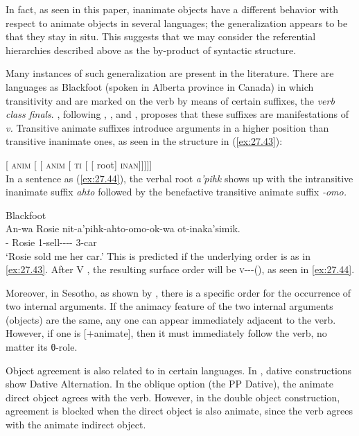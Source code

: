 \documentclass[output=paper]{langsci/langscibook}
\begin{document}
In fact, as seen in this paper, inanimate objects have a different behavior
with respect to animate objects in several languages; the generalization
appears to be that they stay in situ. This suggests that we may consider the
referential hierarchies described above as the by-product of syntactic
structure.

Many instances of such generalization are present in the literature. There are
languages as Blackfoot (spoken in Alberta province in Canada) in which
transitivity and  are marked on the verb by means of certain suffixes,
the \emph{verb class finals}. \citet[66]{Bliss2010}, following
\citet{RitterRosen2008}, \citet{Brittain2003}, \citet{Hirose2001} and
\citet{Mathieu2006}, proposes that these suffixes are manifestations of
\emph{v.}  Transitive animate suffixes introduce arguments in a higher
position than transitive inanimate ones, as seen in the structure in
(\ref{ex:27.43}):

\ea\label{ex:27.43}
    [ \textsc{anim} [  \Ta{} [
    \textsc{anim}  [ \textsc{ti} [  [ root] \textsc{inan}]]]]]\\
\z
In a sentence as (\ref{ex:27.44}), the verbal root \emph{a'pihk} shows up with
the intransitive inanimate suffix \emph{ahto} followed by the benefactive
transitive animate suffix \emph{-omo.}

\ea\label{ex:27.44} Blackfoot \citep[67]{Bliss2010}\\
    \gll    An-wa     Rosie nit-a'pihk-ahto-omo-ok-wa ot-inaka'simik.\\
        \Dem-\Prox{} Rosie 1-sell-\Ti-\Ben-\Inv-\Prox{} 3-car\\
    \glt    `Rosie sold me her car.'
\z
This is predicted if the underlying order is as in \eqref{ex:27.43}. After
V , the resulting surface order will be \textsc{v}-\Ti-\Ta-(\Ben), as seen
in \eqref{ex:27.44}.

Moreover, in Sesotho, as shown by \textcite{DemuthMachobaneMoloiOdato2005},
there is a specific order for the occurrence of two internal arguments. If the
animacy feature of the two internal arguments (objects) are the same, any one
can appear immediately adjacent to the verb. However, if one is [$+$animate],
then it must immediately follow the verb, no matter its θ-role.

Object agreement is also related to  in certain languages. In
 \parencite{Hualde1989,Woolford2000}, dative constructions show
Dative Alternation.  In the oblique option (the PP Dative), the animate direct
object agrees with the verb. However, in the double object
construction,
agreement is blocked when the direct object is also animate, since the verb
agrees with the animate indirect object.
\end{document}
